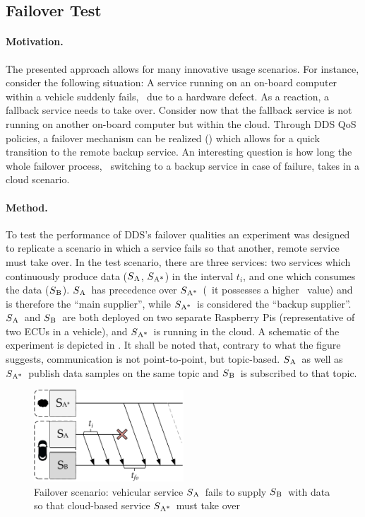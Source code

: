 \subsection{Failover Test}\label{sec:failovertest}
\paragraph{Motivation.} The presented approach allows for many innovative usage scenarios. For instance, consider the following situation: A service running on an on-board computer within a vehicle suddenly fails, \eg\ due to a hardware defect. As a reaction, a fallback service needs to take over. Consider now that the fallback service is not running on another on-board computer but within the cloud. Through DDS QoS policies, a failover mechanism can be realized (\cf {}) which allows for a quick transition to the remote backup service. An interesting question is how long the whole failover process, \ie\ switching to a backup service in case of failure, takes in a cloud scenario.

\newcommand{\proda}{$S\textsubscript{A}$}
\newcommand{\prodb}{$S\textsubscript{A*}$}
\newcommand{\cons}{$S\textsubscript{B}$}

\paragraph{Method.} To test the performance of DDS's failover qualities an experiment was designed to replicate a scenario in which a service fails so that another, remote service must take over. In the test scenario, there are three services: two services which continuously produce data (\proda , \prodb) in the interval $t_i$, and one which consumes the data (\cons). \proda\ has precedence over \prodb\ (\ie\ it possesses a higher \ownership\ value) and is therefore the ``main supplier'', while \prodb\ is considered the ``backup supplier''. \proda\ and \cons\ are both deployed on two separate Raspberry Pis (representative of two ECUs in a vehicle), and \prodb\ is running in the cloud. A schematic of the experiment is depicted in . It shall be noted that, contrary to what the figure suggests, communication is not point-to-point, but topic-based. \proda\ as well as \prodb\ publish data samples on the same topic and \cons\ is subscribed to that topic.
\begin{figure}[htpb]
  \centering
  \includegraphics[width=0.5\textwidth]{figures/takeover}
  \caption[Failover experiment schematic]{Failover scenario: vehicular service \proda\ fails to supply \cons\ with data so that cloud-based service \prodb\ must take over}\label{fig:failover}
\end{figure}

